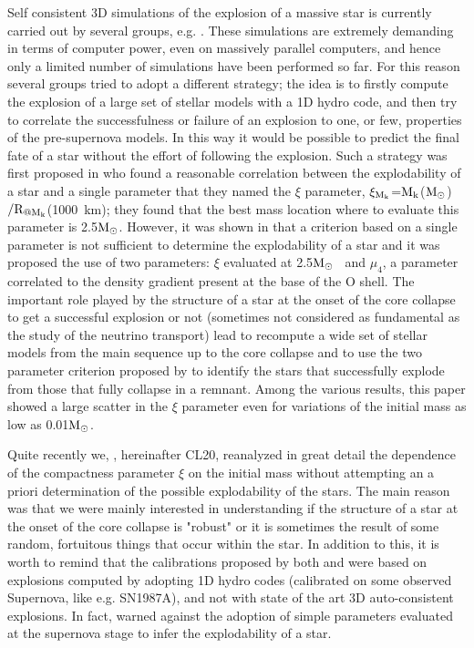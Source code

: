 \documentclass{aastex631}
\newcommand{\msun}{$\rm M_\odot$}
\begin{document}
Self consistent 3D simulations of the explosion of a massive star is currently carried out by several groups, e.g. \cite{ja17,mu17,bu19}. These simulations are extremely demanding in terms of computer power, even on massively parallel computers, and hence only a limited number of simulations have been performed so far. For this reason several groups \citep{oo11,oo13,er16,su18} tried to adopt a different strategy; the idea is to firstly compute the explosion of a large set of stellar models with a 1D hydro code, and then try to correlate the successfulness or failure of an explosion to one, or few, properties of the pre-supernova models. In this way it would be possible to predict the final fate of a star without the effort of following the explosion. Such a strategy was first proposed in \cite{oo11,oo13} who found a reasonable correlation between the explodability of a star and a single parameter that they named the $\xi$ parameter, $\xi_{\rm M_k}$=$\rm M_k$(\msun)$\rm / R_{@M_k}$(1000~km); they found that the best mass location where to evaluate this parameter is 2.5\msun. However, it was shown in \cite{er16} that a criterion based on a single parameter is not sufficient to determine the explodability of a star and it was proposed the use of two parameters: $\xi$  evaluated at 2.5\msun~ and $\mu_4$, a parameter correlated to the density gradient present at the base of the O shell.
The important role played by the structure of a star at the onset of the core collapse to get a successful explosion or not (sometimes not considered as fundamental as the study of the neutrino transport) lead \cite{su18} to recompute a wide set of stellar models from the main sequence up to the core collapse and to use the two parameter criterion proposed by \cite{er16} to identify the stars that successfully explode from those that fully collapse in a remnant. Among the various results, this paper showed a large scatter in the $\xi$ parameter even for variations of the initial mass as low as 0.01\msun.  

Quite recently we, \citep{cl20}, hereinafter CL20, reanalyzed in great detail the dependence of the compactness parameter $\xi$ on the initial mass without attempting an a priori determination of the possible explodability of the stars. The main reason was that we were mainly interested in understanding if the structure of a star at the onset of the core collapse is "robust" or it is sometimes the result of some random, fortuitous things that occur within the star. In addition to this, it is worth to remind that the calibrations proposed by both \cite{oo11} and \cite{er16} were based on explosions computed by adopting 1D hydro codes (calibrated on some observed Supernova, like e.g. SN1987A), and not with state of the art 3D auto-consistent explosions. In fact, \cite{bu19} warned against the adoption of simple parameters evaluated at the supernova stage to infer the explodability of a star.
\end{document}
